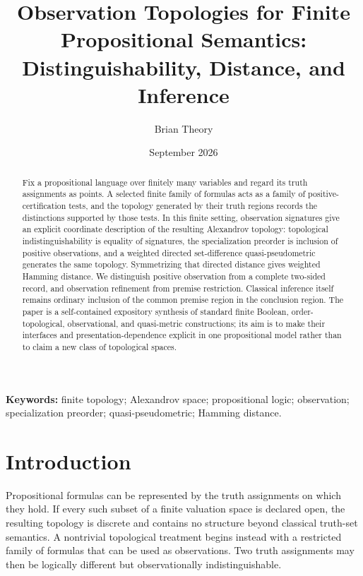 \documentclass[11pt]{article}
\title{Observation Topologies for Finite Propositional Semantics:\\Distinguishability, Distance, and Inference}
\author{Brian Theory}
\date{September 2026}
\theoremstyle{definition}
\theoremstyle{plain}
\theoremstyle{remark}
\begin{document}
\maketitle

\begin{abstract}
Fix a propositional language over finitely many variables and regard its truth
assignments as points.  A selected finite family of formulas acts as a family
of positive-certification tests, and the topology generated by their truth
regions records the distinctions supported by those tests.  In this finite
setting, observation signatures give an explicit coordinate description of the
resulting Alexandrov topology: topological indistinguishability is equality of
signatures, the specialization preorder is inclusion of positive observations,
and a weighted directed set-difference quasi-pseudometric generates the same
topology.  Symmetrizing that directed distance gives weighted Hamming distance.
We distinguish positive observation from a complete two-sided record, and
observation refinement from premise restriction.  Classical inference itself
remains ordinary inclusion of the common premise region in the conclusion
region.  The paper is a self-contained expository synthesis of standard finite
Boolean, order-topological, observational, and quasi-metric constructions; its
aim is to make their interfaces and presentation-dependence explicit in one
propositional model rather than to claim a new class of topological spaces.
\end{abstract}

\noindent\textbf{Keywords:} finite topology; Alexandrov space; propositional logic;
observation; specialization preorder; quasi-pseudometric; Hamming distance.

\tableofcontents

\section{Introduction}

Propositional formulas can be represented by the truth assignments on which
they hold.  If every such subset of a finite valuation space is declared open,
the resulting topology is discrete and contains no structure beyond classical
truth-set semantics.  A nontrivial topological treatment begins instead with a
restricted family of formulas that can be used as observations.  Two truth
assignments may then be logically different but observationally
indistinguishable.
\end{document}
